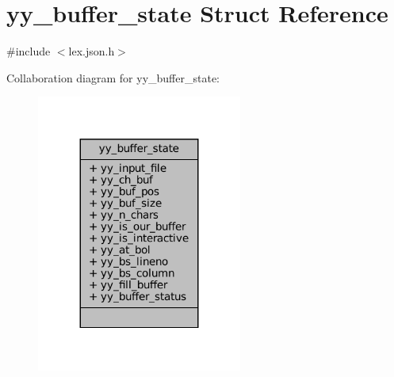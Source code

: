 \hypertarget{structyy__buffer__state}{}\section{yy\+\_\+buffer\+\_\+state Struct Reference}
\label{structyy__buffer__state}


{\ttfamily \#include $<$lex.\+json.\+h$>$}



Collaboration diagram for yy\+\_\+buffer\+\_\+state\+:
\nopagebreak
\begin{figure}[H]
\begin{center}
\leavevmode
\includegraphics[width=191pt]{structyy__buffer__state__coll__graph}
\end{center}
\end{figure}
